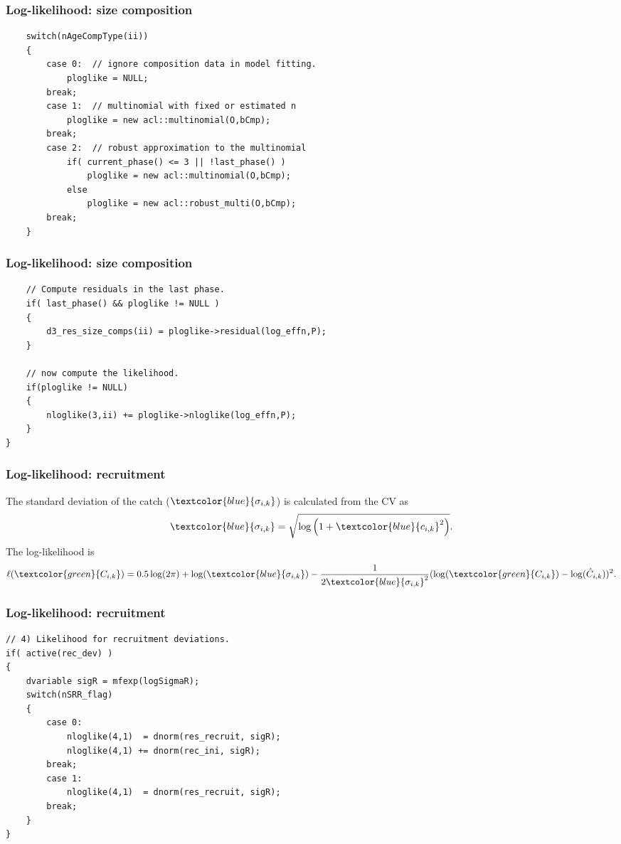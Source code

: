 \documentclass{beamer}
\begin{document}
\begin{frame}[fragile]
\frametitle{Log-likelihood: size composition}
\begin{verbatim}
    switch(nAgeCompType(ii))
    {
        case 0:  // ignore composition data in model fitting.
            ploglike = NULL;
        break;
        case 1:  // multinomial with fixed or estimated n
            ploglike = new acl::multinomial(O,bCmp);
        break;
        case 2:  // robust approximation to the multinomial
            if( current_phase() <= 3 || !last_phase() )
                ploglike = new acl::multinomial(O,bCmp);
            else
                ploglike = new acl::robust_multi(O,bCmp);
        break;
    }
\end{verbatim}
\end{frame}

\begin{frame}[fragile]
\frametitle{Log-likelihood: size composition}
\begin{verbatim}
    // Compute residuals in the last phase.
    if( last_phase() && ploglike != NULL ) 
    {
        d3_res_size_comps(ii) = ploglike->residual(log_effn,P);
    }

    // now compute the likelihood.
    if(ploglike != NULL)
    {
        nloglike(3,ii) += ploglike->nloglike(log_effn,P);			
    }
}
\end{verbatim}
\end{frame}


\begin{frame}
\frametitle{Log-likelihood: recruitment}
The standard deviation of the catch ($\textcolor{blue}{\sigma_{i,k}}$) is calculated
from the CV as
\begin{equation*}
  \textcolor{blue}{\sigma_{i,k}} = \sqrt{\log \left( 1+\textcolor{blue}{c_{i,k}}^2 \right)}.
\end{equation*}
The log-likelihood is
\begin{equation*}
  \ell(\textcolor{green}{C_{i,k}}) = 0.5 \log (2 \pi) + \log
  (\textcolor{blue}{\sigma_{i,k}}) -
  \frac{1}{2\textcolor{blue}{\sigma_{i,k}}^2} (\log (\textcolor{green}{C_{i,k}})
  - \log (\hat{C}_{i,k}))^2.
\end{equation*}
\end{frame}

\begin{frame}[fragile]
\frametitle{Log-likelihood: recruitment}
\begin{verbatim}
// 4) Likelihood for recruitment deviations.
if( active(rec_dev) )
{
    dvariable sigR = mfexp(logSigmaR);
    switch(nSRR_flag)
    {
        case 0:  
            nloglike(4,1)  = dnorm(res_recruit, sigR);
            nloglike(4,1) += dnorm(rec_ini, sigR);
        break;
        case 1:
            nloglike(4,1)  = dnorm(res_recruit, sigR);
        break;
    }
}
\end{verbatim}
\end{frame}
\end{document}
